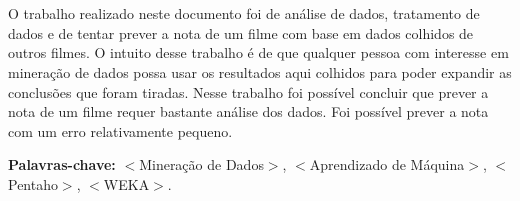 \section*{}
O trabalho realizado neste documento foi de análise de dados, tratamento de dados e de tentar prever a nota de um filme com base em dados colhidos de outros filmes. O intuito desse trabalho é de que qualquer pessoa com interesse em mineração de dados possa usar os resultados aqui colhidos para poder expandir as conclusões que foram tiradas. Nesse trabalho foi possível concluir que prever a nota de um filme requer bastante análise dos dados. Foi possível prever a nota com um erro relativamente pequeno.

{\bf Palavras-chave:} $<$Mineração de Dados$>$,  $<$Aprendizado de Máquina$>$, $<$Pentaho$>$, $<$WEKA$>$.